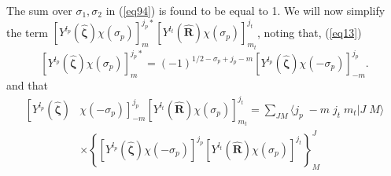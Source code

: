 The sum over $\sigma_1,\sigma_2$ in (\ref{eq94}) is found to be equal to 1. We will now simplify the term $\left[Y^{l_p}
    (\hat{\boldsymbol{\zeta}})\chi(\sigma_p)\right]^{j_p*}_{m}\left[Y^{l_t}(\hat{\mathbf{R}})\chi(\sigma_p)\right]^{j_t}_{m_t}$,  noting that, (\ref{eq13})
\begin{equation}\label{eq96}
\left[Y^{l_p}(\hat{\boldsymbol{\zeta}})\chi(\sigma_p)\right]^{j_p*}_{m}=(-1)^{1/2-\sigma_p+j_p-m}
\left[Y^{l_p}(\hat{\boldsymbol{\zeta}})\chi(-\sigma_p)\right]^{j_p}_{-m}.
\end{equation}
and that
\begin{equation}\label{eq7_2_10}
\begin{split}
\left[Y^{l_p}(\hat{\boldsymbol{\zeta}})\right.&\left.\chi(-\sigma_p)\right]^{j_p}_{-m}
 \left[Y^{l_t}(\hat{\mathbf{R}})\chi(\sigma_p)\right]^{j_t}_{m_t}=\sum_{JM}\langle j_p \;-m\;j_t\;m_t|J\;M\rangle\\
 &\times\left\{\left[Y^{l_p}
 (\hat{\boldsymbol{\zeta}})\chi(-\sigma_p)\right]^{j_p}
 \left[Y^{l_t}(\hat{\mathbf{R}})\chi(\sigma_p)\right]^{j_t}\right\}_{M}^{J}\\
 \end{split}
\end{equation}

